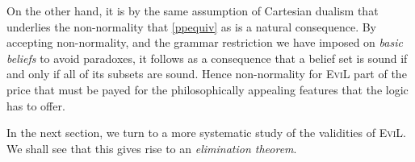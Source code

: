 On the other hand, it is by the same assumption of Cartesian dualism
that underlies the non-normality that \eqref{ppequiv}
as is a natural consequence.  By accepting non-normality, and the
grammar restriction we have imposed on \emph{basic beliefs} to avoid
paradoxes, it follows as a consequence that a belief set is sound if
and only if all of its subsets are sound.  Hence non-normality for
\textsc{EviL} part of the price that must be payed %
for the philosophically appealing features that the logic has to offer.

In the next section, we turn to a more systematic study of the
validities of \textsc{EviL}.  We shall see that this gives rise to an
\emph{elimination theorem}.
